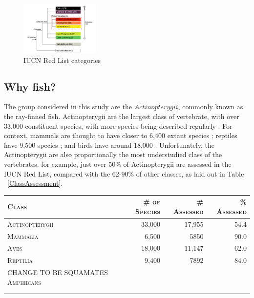 \documentclass[11pt]{article}
\begin{document}
\begin{figure}
	
	\includegraphics[width=0.35\textwidth]{Images/RedListCategories.png}
	\caption{IUCN Red List categories \\  \autocite{IUCN2000} }
	\label{IUCNcategories}
	
\end{figure}


\subsection{Why fish?}

The group considered in this study are the \(Actinopterygii\), commonly 
known as the ray-finned fish. Actinopterygii are the largest class of 
vertebrate, with over 33,000 constituent species, with more species being 
described regularly \autocite{Fishbase}. For 
context, mammals are thought to have closer to 6,400 extant species 
\autocite{Mammal2020}; reptiles have 9,500 species 
\autocite{Pincheira-Donoso2013}
; and birds have around 18,000 \autocite{Barrowclough2016}. Unfortunately, the 
Actinopterygii are also proportionally 
the most understudied class of the vertebrates. for example, just over 50\% 
of Actinopterygii are assessed in the IUCN Red List, 
compared with the 62-90\% of other classes, as laid out in 
Table ~\ref{ClassAssessment}. \\

	\begin{tabular}{lrrr}
	\textsc{Class} & \textsc{\# of Species} & \textsc{\# Assessed} & \textsc{\% 
	Assessed} \\	
	\hline
	\textsc{Actinopterygii}	& 33,000 & 17,955 & 54.4 \\
	\textsc{Mammalia} & 6,500 & 5850 & 90.0 \\
	\textsc{Aves} & 18,000 & 11,147 & 62.0 \\
	\textsc{Reptilia} & 9,400 & 7892 & 84.0 \\  CHANGE TO BE SQUAMATES
	\textsc{Amphibians}
	\multicolumn{4}{l}{\caption{Table ~\ref{ClassAssessment}: IUCN 
	Red List  assessments for vertebrate classes}} \\
	\multicolumn{4}{l}{ \autocite{Mammal2020, Pincheira-Donoso2013}} \\
	\multicolumn{4}{l}{ \autocite{Barrowclough2016, Fishbase}}
	\label{ClassAssessment}
	
\end{tabular}
\newline
\newline
\end{document}
